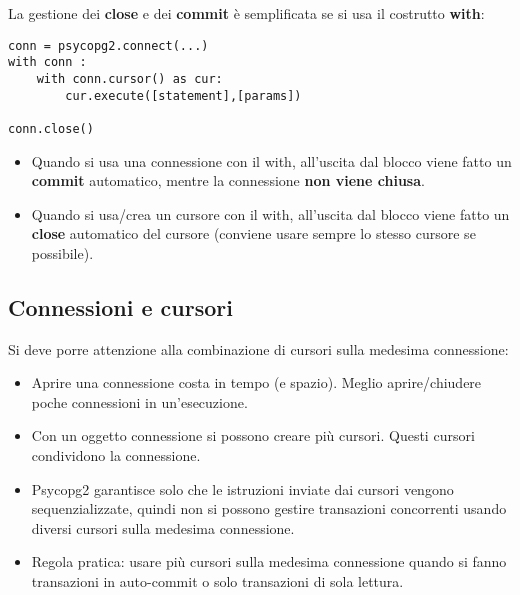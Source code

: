 \documentclass[a4paper, 10pt, titlepage]{article}
\begin{document}
	La gestione dei \textbf{close} e dei \textbf{commit} è semplificata se si usa il costrutto \textbf{with}:
	\begin{lstlisting}[frame=tb]
conn = psycopg2.connect(...)
with conn :
	with conn.cursor() as cur:
		cur.execute([statement],[params])
		
conn.close()
	\end{lstlisting}
	\begin{itemize}
	\item Quando si usa una connessione con il with, all’uscita dal blocco viene fatto un \textbf{commit} automatico, mentre la connessione \textbf{non viene chiusa}.
	\item Quando si usa/crea un cursore con il with, all’uscita dal blocco viene fatto un \textbf{close} automatico del cursore (conviene usare sempre lo stesso cursore se possibile).
	\end{itemize}
	\subsection{Connessioni e cursori}
	Si deve porre attenzione alla combinazione di cursori sulla medesima connessione:
	\begin{itemize}
	\item Aprire una connessione costa in tempo (e spazio). Meglio
aprire/chiudere poche connessioni in un’esecuzione.
	\item Con un oggetto connessione si possono creare più cursori. Questi cursori condividono la connessione.
	\item Psycopg2 garantisce solo che le istruzioni inviate dai cursori vengono sequenzializzate, quindi non si possono gestire transazioni concorrenti usando diversi cursori sulla medesima connessione.
	\item Regola pratica: usare più cursori sulla medesima connessione quando si fanno transazioni in auto-commit o solo transazioni di sola lettura.
	\end{itemize}
	
\end{document}
